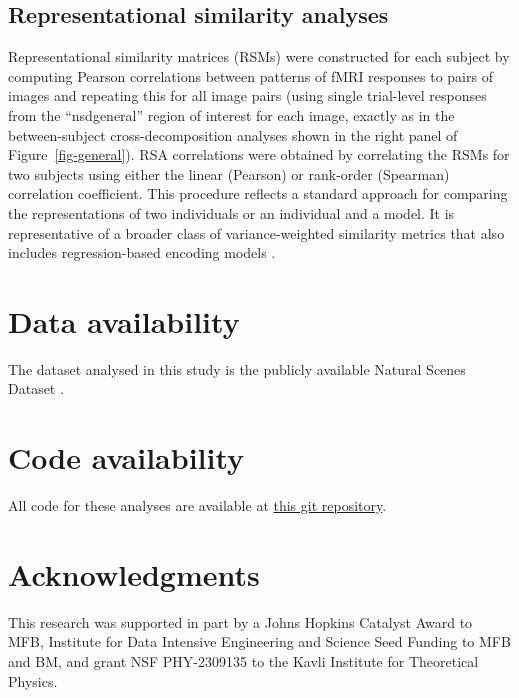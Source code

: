 \documentclass[10pt]{article}
\begin{document}
\subsection{Representational similarity
analyses}\label{representational-similarity-analyses}

Representational similarity matrices (RSMs) were constructed for each
subject by computing Pearson correlations between patterns of fMRI
responses to pairs of images and repeating this for all image pairs
(using single trial-level responses from the ``nsdgeneral'' region of
interest for each image, exactly as in the between-subject
cross-decomposition analyses shown in the right panel of
Figure~\ref{fig-general}). RSA correlations were obtained by correlating
the RSMs for two subjects using either the linear (Pearson) or
rank-order (Spearman) correlation coefficient. This procedure reflects a
standard approach for comparing the representations of two individuals
or an individual and a model. It is representative of a broader class of
variance-weighted similarity metrics that also includes regression-based
encoding models \autocite{Kriegeskorte2019,Kornblith2019}.

\section{Data availability}\label{data-availability}

The dataset analysed in this study is the publicly available Natural
Scenes Dataset \autocite{Allen2021}.

\section{Code availability}\label{code-availability}

All code for these analyses are available at
\href{https://github.com/BonnerLab/scale-free-visual-cortex}{this git
repository}.

\section{Acknowledgments}\label{acknowledgments}

This research was supported in part by a Johns Hopkins Catalyst Award to
MFB, Institute for Data Intensive Engineering and Science Seed Funding
to MFB and BM, and grant NSF PHY-2309135 to the Kavli Institute for
Theoretical Physics.

\newpage{}
\end{document}
